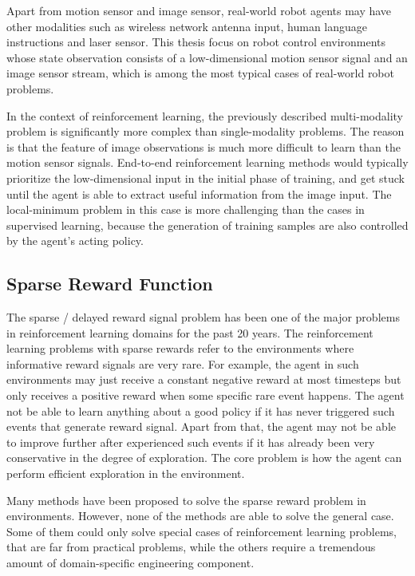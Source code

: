 Apart from motion sensor and image sensor, real-world robot agents may have other modalities such as wireless network antenna input, human language instructions and laser sensor. This thesis focus on robot control environments whose state observation consists of a low-dimensional motion sensor signal and an image sensor stream, which is among the most typical cases of real-world robot problems.

In the context of reinforcement learning, the previously described multi-modality problem is significantly more complex than single-modality problems. The reason is that the feature of image observations is much more difficult to learn than the motion sensor signals. End-to-end reinforcement learning methods would typically prioritize the low-dimensional input in the initial phase of training, and get stuck until the agent is able to extract useful information from the image input. The local-minimum problem in this case is more challenging than the cases in supervised learning, because the generation of training samples are also controlled by the agent's acting policy.

\subsection{Sparse Reward Function}
The sparse / delayed reward signal problem has been one of the major problems in reinforcement learning domains for the past 20 years. The reinforcement learning problems with sparse rewards refer to the environments where informative reward signals are very rare. For example, the agent in such environments may just receive a constant negative reward at most timesteps but only receives a positive reward when some specific rare event happens. The agent not be able to learn anything about a good policy if it has never triggered such events that generate reward signal. Apart from that, the agent may not be able to improve further after experienced such events if it has already been very conservative in the degree of exploration. The core problem is how the agent can perform efficient exploration in the environment.

Many methods have been proposed to solve the sparse reward problem in environments. However, none of the methods are able to solve the general case. Some of them could only solve special cases of reinforcement learning problems, that are far from practical problems, while the others require a tremendous amount of domain-specific engineering component.


